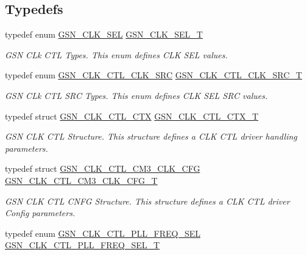\subsection*{Typedefs}
\begin{DoxyCompactItemize}
\item 
typedef enum \hyperlink{a00644_ga1b0f0bc3777cd50abe5f39797df023b5}{GSN\_\-CLK\_\-SEL} \hyperlink{a00644_gaf4925c33b2dac850008f7d4463760580}{GSN\_\-CLK\_\-SEL\_\-T}
\begin{DoxyCompactList}\small\item\em GSN CLk CTL Types. This enum defines CLK SEL values. \end{DoxyCompactList}\item 
typedef enum \hyperlink{a00644_ga53f0e57a2fa30eef772141f9ac772202}{GSN\_\-CLK\_\-CTL\_\-CLK\_\-SRC} \hyperlink{a00644_ga95d23078ba56d33653b82794ca56f5d6}{GSN\_\-CLK\_\-CTL\_\-CLK\_\-SRC\_\-T}
\begin{DoxyCompactList}\small\item\em GSN CLk CTL SRC Types. This enum defines CLK SEL SRC values. \end{DoxyCompactList}\item 
typedef struct \hyperlink{a00039}{GSN\_\-CLK\_\-CTL\_\-CTX} \hyperlink{a00644_ga9e7d0d37ecaac3d985e5618e1c8c57d5}{GSN\_\-CLK\_\-CTL\_\-CTX\_\-T}
\begin{DoxyCompactList}\small\item\em GSN CLK CTL Structure. This structure defines a CLK CTL driver handling parameters. \end{DoxyCompactList}\item 
typedef struct \hyperlink{a00038}{GSN\_\-CLK\_\-CTL\_\-CM3\_\-CLK\_\-CFG} \hyperlink{a00644_ga8a7770f0cdba320f9d6418cc8419b450}{GSN\_\-CLK\_\-CTL\_\-CM3\_\-CLK\_\-CFG\_\-T}
\begin{DoxyCompactList}\small\item\em GSN CLK CTL CNFG Structure. This structure defines a CLK CTL driver Config parameters. \end{DoxyCompactList}\item 
typedef enum \hyperlink{a00477_a7e6656786e3a4b1ea2697ba42a89457d}{GSN\_\-CLK\_\-CTL\_\-PLL\_\-FREQ\_\-SEL} \hyperlink{a00477_ac0f1ee78197c9b51f46253d4b8eefc02}{GSN\_\-CLK\_\-CTL\_\-PLL\_\-FREQ\_\-SEL\_\-T}
\end{DoxyCompactItemize}
